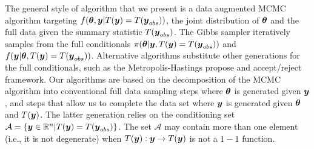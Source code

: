 \documentclass[12pt]{article}
\def\bth{\mbox{\boldmath $\theta$}}
\newcommand{\by}{\mbox{\boldmath $y$}}
\newcommand{\red}[1]{{\color{red}#1}}
\newcommand{\green}[1]{{\color{green}#1}}
\begin{document}
The general style of algorithm that we present is a data augmented
MCMC algorithm targeting $f(\bth, \by |
T(\by)=T(\by_{obs}))$, the joint distribution of $\bth$ and the full
data given the summary statistic $T(\by_{obs})$.  %
 The Gibbs sampler \citep{gelfand1990} iteratively samples from the
 full conditionals $\pi(\bth|\by, T(\by)=T(\by_{obs}))$ and
 $f(\by|\bth, T(\by)=T(\by_{obs}))$.  
\green{Alternative algorithms substitute other generations for the full conditionals, such as the Metropolis-Hastings propose and accept/reject framework.  Our algorithms are based on the decomposition of the MCMC algorithm into conventional full data sampling steps where $\bth$ is generated given $\by$, and steps that allow us to complete the data set where $\by$ is generated given $\bth$ and $T(\by)$.  The latter generation relies on the conditioning set $\mathcal{A}=\{\by\in \mathbb{R}^n|T(\by)=T(\by_{obs})\}$.  The set $\mathcal{A}$ may contain more than one element (i.e., it is not degenerate) when $T(\by) : \by \rightarrow T(\by)$ is not a $1-1$ function.}
 
\end{document}
